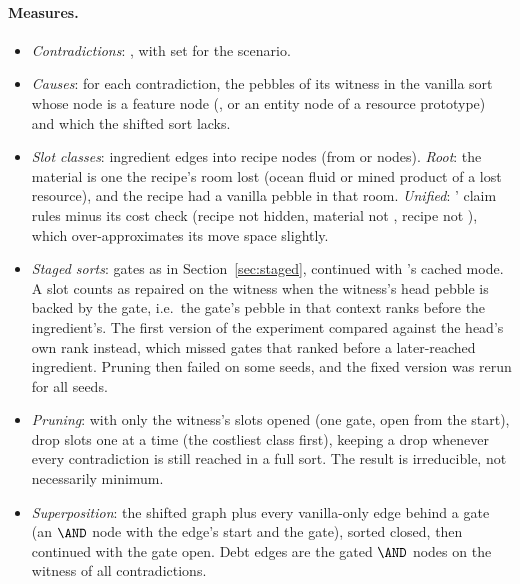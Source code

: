 \paragraph{Measures.}
\begin{itemize}[nosep]
\item \emph{Contradictions}: , with  set for the scenario.
\item \emph{Causes}: for each contradiction, the pebbles of its  witness in the vanilla sort whose node is a feature node (, or an entity node of a resource prototype) and which the shifted sort lacks.
\item \emph{Slot classes}: ingredient edges into recipe nodes (from  or  nodes). \emph{Root}: the material is one the recipe's room lost (ocean fluid or mined product of a lost resource), and the recipe had a vanilla pebble in that room. \emph{Unified}: ' claim rules minus its cost check (recipe not hidden, material not , recipe not ), which over-approximates its move space slightly.
\item \emph{Staged sorts}: gates as in Section~\ref{sec:staged}, continued with 's cached mode. A slot counts as repaired on the witness when the witness's head pebble is backed by the gate, i.e.\ the gate's pebble in that context ranks before the ingredient's. The first version of the experiment compared against the head's own rank instead, which missed gates that ranked before a later-reached ingredient. Pruning then failed on some seeds, and the fixed version was rerun for all seeds.
\item \emph{Pruning}: with only the witness's slots opened (one gate, open from the start), drop slots one at a time (the costliest class first), keeping a drop whenever every contradiction is still reached in a full sort. The result is irreducible, not necessarily minimum.
\item \emph{Superposition}: the shifted graph plus every vanilla-only edge behind a gate (an $\AND$ node with the edge's start and the gate), sorted closed, then continued with the gate open. Debt edges are the gated $\AND$ nodes on the witness of all contradictions.
\end{itemize}

